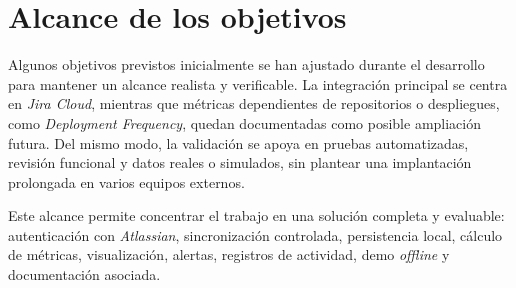 \section{Alcance de los objetivos}

Algunos objetivos previstos inicialmente se han ajustado durante el desarrollo para mantener un alcance realista y verificable. La integración principal se centra en \textit{Jira Cloud}, mientras que métricas dependientes de repositorios o despliegues, como \textit{Deployment Frequency}, quedan documentadas como posible ampliación futura. Del mismo modo, la validación se apoya en pruebas automatizadas, revisión funcional y datos reales o simulados, sin plantear una implantación prolongada en varios equipos externos.

Este alcance permite concentrar el trabajo en una solución completa y evaluable: autenticación con \textit{Atlassian}, sincronización controlada, persistencia local, cálculo de métricas, visualización, alertas, registros de actividad, demo \textit{offline} y documentación asociada.
